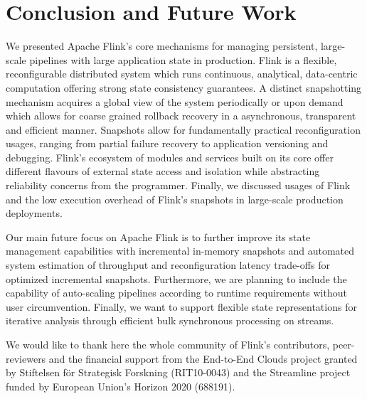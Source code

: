 
\section{Conclusion and Future Work}
\label{sec:conclusion}

We presented Apache Flink's core mechanisms for managing persistent, large-scale pipelines with large application state in production. Flink is a flexible, reconfigurable distributed system which runs continuous, analytical, data-centric computation offering strong state consistency guarantees. A distinct snapshotting mechanism acquires a global view of the system periodically or upon demand which allows for coarse grained rollback recovery in a asynchronous, transparent and efficient manner. Snapshots allow for fundamentally practical reconfiguration usages, ranging from partial failure recovery to application versioning and debugging. Flink's ecosystem of modules and services built on its core offer different flavours of external state access and isolation while abstracting reliability concerns from the programmer. Finally, we discussed usages of Flink and the low execution overhead of Flink's snapshots in large-scale production deployments.

\vspace{-1mm}
 Our main future focus on Apache Flink is to further improve its state management capabilities with incremental in-memory snapshots and automated system estimation of throughput and reconfiguration latency trade-offs for optimized incremental snapshots. Furthermore, we are planning to include the capability of auto-scaling pipelines according to runtime requirements without user circumvention. Finally, we want to support flexible state representations for iterative analysis through efficient bulk synchronous processing on streams.

\vspace{-1mm}
 We would like to thank here the whole community of Flink's contributors, peer-reviewers and the financial support from the End-to-End Clouds project granted by Stiftelsen f\"{o}r Strategisk Forskning (RIT10-0043) and the Streamline project funded by European Union's Horizon 2020 (688191).